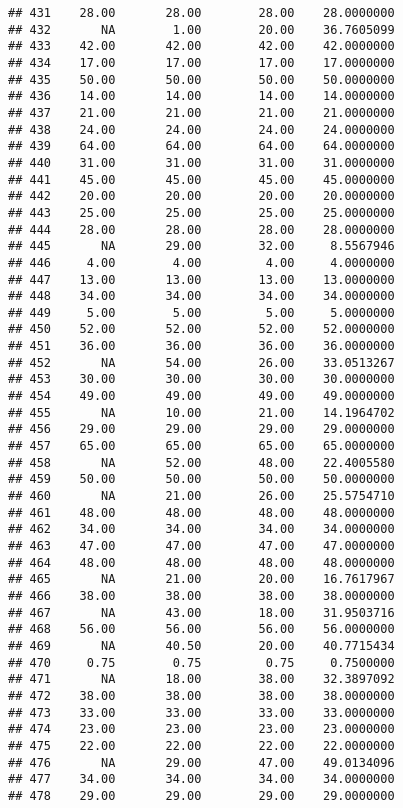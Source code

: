\documentclass[
]{article}
\begin{document}
\begin{verbatim}
## 431    28.00       28.00        28.00    28.0000000
## 432       NA        1.00        20.00    36.7605099
## 433    42.00       42.00        42.00    42.0000000
## 434    17.00       17.00        17.00    17.0000000
## 435    50.00       50.00        50.00    50.0000000
## 436    14.00       14.00        14.00    14.0000000
## 437    21.00       21.00        21.00    21.0000000
## 438    24.00       24.00        24.00    24.0000000
## 439    64.00       64.00        64.00    64.0000000
## 440    31.00       31.00        31.00    31.0000000
## 441    45.00       45.00        45.00    45.0000000
## 442    20.00       20.00        20.00    20.0000000
## 443    25.00       25.00        25.00    25.0000000
## 444    28.00       28.00        28.00    28.0000000
## 445       NA       29.00        32.00     8.5567946
## 446     4.00        4.00         4.00     4.0000000
## 447    13.00       13.00        13.00    13.0000000
## 448    34.00       34.00        34.00    34.0000000
## 449     5.00        5.00         5.00     5.0000000
## 450    52.00       52.00        52.00    52.0000000
## 451    36.00       36.00        36.00    36.0000000
## 452       NA       54.00        26.00    33.0513267
## 453    30.00       30.00        30.00    30.0000000
## 454    49.00       49.00        49.00    49.0000000
## 455       NA       10.00        21.00    14.1964702
## 456    29.00       29.00        29.00    29.0000000
## 457    65.00       65.00        65.00    65.0000000
## 458       NA       52.00        48.00    22.4005580
## 459    50.00       50.00        50.00    50.0000000
## 460       NA       21.00        26.00    25.5754710
## 461    48.00       48.00        48.00    48.0000000
## 462    34.00       34.00        34.00    34.0000000
## 463    47.00       47.00        47.00    47.0000000
## 464    48.00       48.00        48.00    48.0000000
## 465       NA       21.00        20.00    16.7617967
## 466    38.00       38.00        38.00    38.0000000
## 467       NA       43.00        18.00    31.9503716
## 468    56.00       56.00        56.00    56.0000000
## 469       NA       40.50        20.00    40.7715434
## 470     0.75        0.75         0.75     0.7500000
## 471       NA       18.00        38.00    32.3897092
## 472    38.00       38.00        38.00    38.0000000
## 473    33.00       33.00        33.00    33.0000000
## 474    23.00       23.00        23.00    23.0000000
## 475    22.00       22.00        22.00    22.0000000
## 476       NA       29.00        47.00    49.0134096
## 477    34.00       34.00        34.00    34.0000000
## 478    29.00       29.00        29.00    29.0000000

\end{verbatim}
\end{document}
